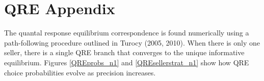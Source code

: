 \documentclass[12pt]{article}
\begin{document}







\section{QRE Appendix}

The quantal response equilibrium correspondence is found numerically using a path-following procedure outlined in Turocy (2005, 2010). When there is only one seller, there is a single QRE branch that converges to the unique informative equilibrium. Figures \ref{QREprobs_n1} and \ref{QREsellerstrat_n1} show how QRE choice probabilities evolve as precision increases. 




\end{document}
